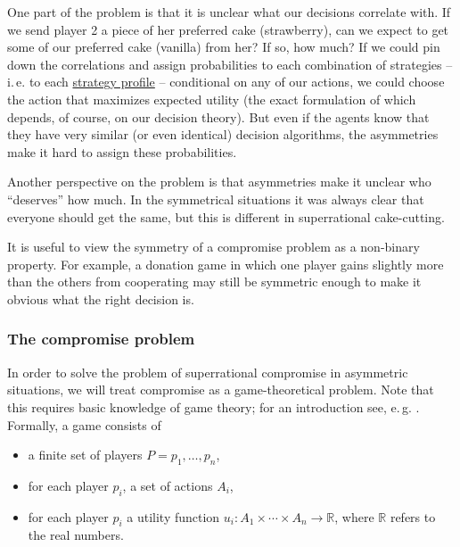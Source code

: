 One part of the problem is that it is unclear what our decisions
correlate with. If we send player 2 a piece of her preferred cake
(strawberry), can we expect to get some of our preferred cake (vanilla)
from her? If so, how much? If we could pin down the correlations and
assign probabilities to each combination of strategies -- i.\,e. to each
\href{https://en.wikipedia.org/wiki/Strategy_(game_theory)}{strategy
profile} -- conditional on any of our actions, we could choose the
action that maximizes expected utility (the exact formulation of which
depends, of course, on our decision theory). But even if the agents know
that they have very similar (or even identical) decision algorithms, the
asymmetries make it hard to assign these probabilities.

Another perspective on the problem is that asymmetries make it unclear
who ``deserves'' how much. In the symmetrical situations it was always
clear that everyone should get the same, but this is different in
superrational cake-cutting.

It is useful to view the symmetry of a compromise problem as a
non-binary property. For example, a donation game in which one player
gains slightly more than the others from cooperating may still be
symmetric enough to make it obvious what the right decision is.

\hypertarget{the-compromise-problem}{\subsubsection{The compromise
problem}\label{the-compromise-problem}}

In order to solve the problem of superrational compromise in asymmetric
situations, we will treat compromise as a game-theoretical problem. Note
that this requires basic knowledge of game theory; for an introduction
see, e.\,g. \citeyear{Osborne2004-ui}. Formally, a game
consists of

\begin{itemize}
\item
  a finite set of players \(P = { p_{1},\dotsc,p_{n}}\),
\item
  for each player \(p_{i}\), a set of actions \(A_{i}\),
\item
  for each player \(p_{i}\) a utility function
  \(u_{i}\colon A_{1} \times \dotsm \times A_{n} \rightarrow \mathbb{R}\), where
  \(\mathbb{R}\) refers to the real numbers. 
\end{itemize}

